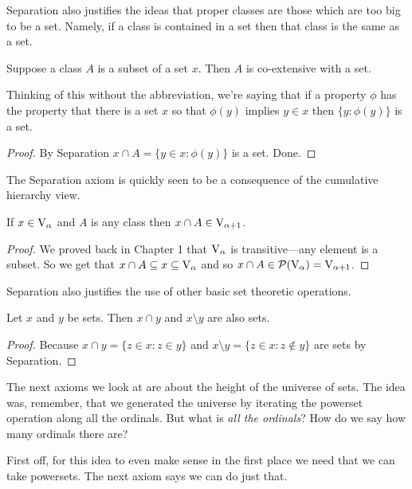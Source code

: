 \documentclass[10pt]{amsart}
\begin{document}
Separation also justifies the ideas that proper classes are those which are too big to be a set. Namely, if a class is contained in a set then that class is the same as a set.

\begin{proposition}
Suppose a class $A$ is a subset of a set $x$. Then $A$ is co-extensive with a set.
\end{proposition}

Thinking of this without the abbreviation, we're saying that if a property $\phi$ has the property that there is a set $x$ so that $\phi(y)$ implies $y \in x$ then $\{ y : \phi(y) \}$ is a set.

\begin{proof}
By Separation $x \cap A = \{ y \in x : \phi(y) \}$ is a set. Done.
\end{proof}

The Separation axiom is quickly seen to be a consequence of the cumulative hierarchy view.

\begin{proposition}
If $x \in \mathrm{V}_\alpha$ and $A$ is any class then $x \cap A \in \mathrm{V}_{\alpha + 1}$. 
\end{proposition}

\begin{proof}
We proved back in Chapter 1 that $\mathrm{V}_\alpha$ is transitive---any element is a subset. So we get that $x \cap A \subseteq x \subseteq \mathrm{V}_\alpha$ and so $x \cap A \in \mathcal{P}(\mathrm{V}_\alpha) = \mathrm{V}_{\alpha + 1}$.
\end{proof}

Separation also justifies the use of other basic set theoretic operations.

\begin{proposition}
Let $x$ and $y$ be sets. Then $x \cap y$ and $x \setminus y$ are also sets.
\end{proposition}

\begin{proof}
Because $x \cap y = \{ z \in x : z \in y \}$ and $x \setminus y = \{ z \in x : z \not \in y \}$ are sets by Separation.
\end{proof}

The next axioms we look at are about the height of the universe of sets. The idea was, remember, that we generated the universe by iterating the powerset operation along all the ordinals. But what is \emph{all the ordinals}? How do we say how many ordinals there are? 

First off, for this idea to even make sense in the first place we need that we can take powersets. The next axiom says we can do just that.
\end{document}
